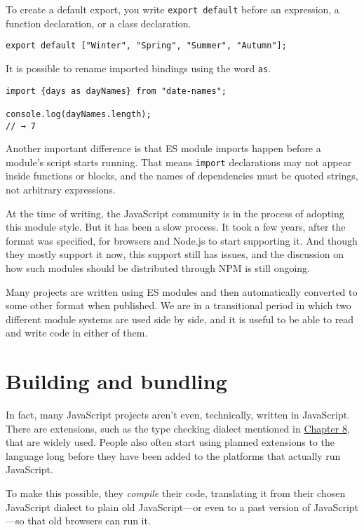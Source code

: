 To create a default export, you write \lstinline`export default` before an expression, a function declaration, or a class declaration.

\begin{lstlisting}
export default ["Winter", "Spring", "Summer", "Autumn"];
\end{lstlisting}
\noindent

It is possible to rename imported bindings using the word \lstinline`as`.

\begin{lstlisting}
import {days as dayNames} from "date-names";

console.log(dayNames.length);
// → 7
\end{lstlisting}
\noindent

Another important difference is that ES module imports happen before a module's script starts running. That means \lstinline`import` declarations may not appear inside functions or blocks, and the names of dependencies must be quoted strings, not arbitrary expressions.

At the time of writing, the JavaScript community is in the process of adopting this module style. But it has been a slow process. It took a few years, after the format was specified, for browsers and Node.js to start supporting it. And though they mostly support it now, this support still has issues, and the discussion on how such modules should be distributed through NPM is still ongoing.

Many projects are written using ES modules and then automatically converted to some other format when published. We are in a transitional period in which two different module systems are used side by side, and it is useful to be able to read and write code in either of them.

\section{Building and bundling}

In fact, many JavaScript projects aren't even, technically, written in JavaScript. There are extensions, such as the type checking dialect mentioned in \hyperref[error.typing]{Chapter 8}, that are widely used. People also often start using planned extensions to the language long before they have been added to the platforms that actually run JavaScript.

To make this possible, they \emph{compile} their code, translating it from their chosen JavaScript dialect to plain old JavaScript—or even to a past version of JavaScript—so that old browsers can run it.

